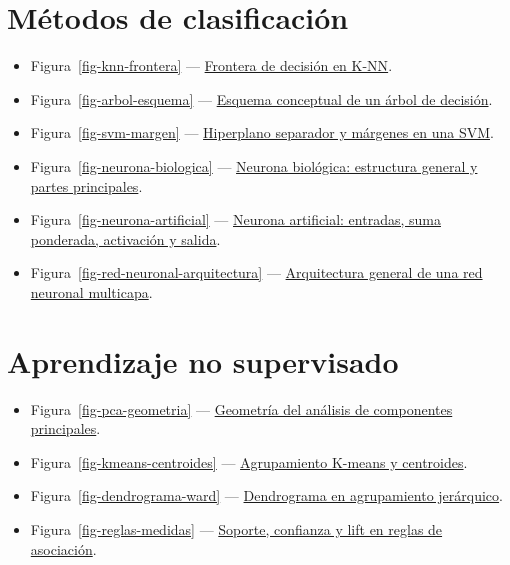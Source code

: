 \documentclass[
  spanish,
  10.5pt,
  letterpaper,
  DIV=11,
  numbers=noendperiod,
  oneside,
  open=any]{scrreprt}
\providecommand{\tightlist}{%
  \setlength{\itemsep}{0pt}\setlength{\parskip}{0pt}}
\theoremstyle{definition}
\theoremstyle{definition}
\theoremstyle{plain}
\theoremstyle{remark}
\begin{document}
\section*{Métodos de
clasificación}\label{muxe9todos-de-clasificaciuxf3n-1}


\begin{itemize}
\tightlist
\item
  Figura~\ref{fig-knn-frontera} --- \hyperref[fig-knn-frontera]{Frontera
  de decisión en K-NN}.
\item
  Figura~\ref{fig-arbol-esquema} ---
  \hyperref[fig-arbol-esquema]{Esquema conceptual de un árbol de
  decisión}.
\item
  Figura~\ref{fig-svm-margen} --- \hyperref[fig-svm-margen]{Hiperplano
  separador y márgenes en una SVM}.
\item
  Figura~\ref{fig-neurona-biologica} ---
  \hyperref[fig-neurona-biologica]{Neurona biológica: estructura general
  y partes principales}.
\item
  Figura~\ref{fig-neurona-artificial} ---
  \hyperref[fig-neurona-artificial]{Neurona artificial: entradas, suma
  ponderada, activación y salida}.
\item
  Figura~\ref{fig-red-neuronal-arquitectura} ---
  \hyperref[fig-red-neuronal-arquitectura]{Arquitectura general de una
  red neuronal multicapa}.
\end{itemize}

\section*{Aprendizaje no
supervisado}\label{aprendizaje-no-supervisado-1}


\begin{itemize}
\tightlist
\item
  Figura~\ref{fig-pca-geometria} ---
  \hyperref[fig-pca-geometria]{Geometría del análisis de componentes
  principales}.
\item
  Figura~\ref{fig-kmeans-centroides} ---
  \hyperref[fig-kmeans-centroides]{Agrupamiento K-means y centroides}.
\item
  Figura~\ref{fig-dendrograma-ward} ---
  \hyperref[fig-dendrograma-ward]{Dendrograma en agrupamiento
  jerárquico}.
\item
  Figura~\ref{fig-reglas-medidas} ---
  \hyperref[fig-reglas-medidas]{Soporte, confianza y lift en reglas de
  asociación}.
\end{itemize}
\end{document}
